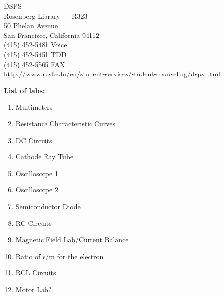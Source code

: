 \documentclass[12pt]{amsart}
\begin{document}
\begin{addmargin}[2em]{2em}
DSPS\\ Rosenberg Library --- R323 \\ 50 Phelan Avenue \\ San Francisco, California 94112 \\ (415) 452-5481 Voice \\ (415) 452-5451 TDD \\ (415) 452-5565 FAX \\ \url{http://www.ccsf.edu/en/student-services/student-counseling/dsps.html}
\end{addmargin}
\textbf{\underline{List of labs:}}
\begin{enumerate}
\item Multimeters
\item Resistance Characteristic Curves
\item DC Circuits
\item Cathode Ray Tube
\item Oscilloscope 1
\item Oscilloscope 2
\item Semiconductor Diode
\item RC Circuits
\item Magnetic Field Lab/Current Balance
\item Ratio of e/m for the electron
\item RCL Circuits
\item Motor Lab?
\end{enumerate}
\end{document}
